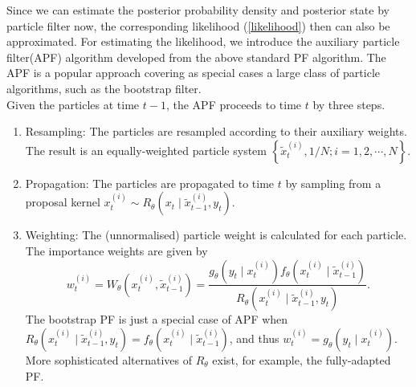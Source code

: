\documentclass[mstat,12pt]{unswthesis}  %
\numberwithin{equation}{section}
\begin{document}
\noindent Since we can estimate the posterior probability density and posterior state by particle filter now,
the corresponding likelihood (\ref{likelihood}) then can also be approximated.
For estimating the likelihood, we introduce the auxiliary particle filter(APF) algorithm developed
from the above standard PF algorithm.
The APF is a popular approach covering as special cases a large class of particle algorithms, such as the bootstrap filter.\\

\noindent Given
the particles at time $t-1$, the APF proceeds to time $t$  by three steps.\\
\begin{enumerate}
    \item Resampling: The particles are resampled according to their auxiliary weights.
    The result is an equally-weighted particle
    system $\left\{\tilde{x}_{t}^{(i)}, 1/N ; i=1,2, \cdots, N\right\}$.\\
    
    \item Propagation: The particles are propagated to time $t$ by sampling from a proposal kernel
    $x_{t}^{(i)} \sim R_{\theta}\left(x_{t} \mid \widetilde{x}_{t-1}^{(i)}, y_{t}\right)$.\\
    
    \item Weighting: The (unnormalised) particle weight is calculated for each particle. The importance weights are given by
    \begin{equation}w_{t}^{(i)}=W_{\theta}\left(x_{t}^{(i)}, \tilde{x}_{t-1}^{(i)}\right)=\frac{g_{\theta}\left(y_{t} \mid x_{t}^{(i)}\right) f_{\theta}\left(x_{t}^{(i)} \mid \widetilde{x}_{t-1}^{(i)}\right)}{R_{\theta}\left(x_{t}^{(i)} \mid \widetilde{x}_{t-1}^{(i)}, y_{t}\right)}.\end{equation}
    The bootstrap PF is just a special case of APF when
    $R_{\theta}\left(x_{t}^{(i)} \mid \widetilde{x}_{t-1}^{(i)},y_{t}\right)=f_{\theta}\left(x_{t}^{(i)} \mid \widetilde{x}_{t-1}^{(i)}\right)$, and thus $w_{t}^{(i)}=g_{\theta}\left(y_{t} \mid x_{t}^{(i)}\right)$. More sophisticated alternatives of
    $R_{\theta}$ exist, for example, the fully-adapted PF.
\end{enumerate}
\end{document}
